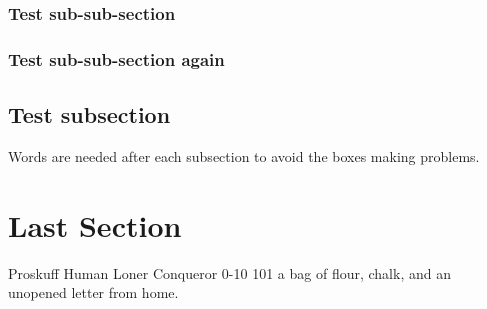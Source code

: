 \documentclass[a4paper,openany]{book}
\begin{document}
{\begin{multicols}{2}
  \dragon

  \showStdSpells


  \elf

  \humansoldier


  \lipsum[3]

  \elf

  \showStdSpells


  \subsubsection{Test sub-sub-section}

  \lipsum[10]

  \subsubsection{Test sub-sub-section again}

  \subsection{Test subsection}
  Words are needed after each subsection to avoid the boxes making problems.



  \lipsum[2]

  \elf

  \showStdSpells


  \lipsum[10]

  \section{Last Section}

  \lipsum[3]

  \end{multicols}

}





\filledCS%
  {Proskuff}%
  {Human}%
  {Loner}%
  {Conqueror}%
  {{0}{-1}{0}}%
  {{1}{0}{1}}%
  {%
    \renewcommand\characterDebt{100~\glsfmtplural{sp}}
    \renewcommand\rank{Fodder}
    \setcounter{Academics}{2}
    \setcounter{Cultivation}{1}
    \setcounter{Air}{2}
    \shortsword
  }%
  {}%
  {a bag of flour, chalk, and an unopened letter from home.}%
\end{document}
